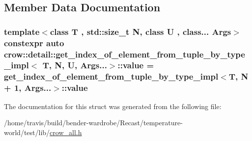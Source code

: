 \subsection{Member Data Documentation}
\hypertarget{structcrow_1_1detail_1_1get__index__of__element__from__tuple__by__type__impl_3_01_t_00_01_n_00_01_u_00_01_args_8_8_8_4_a5caffa263c0c6d186e32e158c3dc8aee}{
\subsubsection[{value}]{\setlength{\rightskip}{0pt plus 5cm}template$<$class T , std\-::size\-\_\-t N, class U , class... Args$>$ constexpr auto {\bf crow\-::detail\-::get\-\_\-index\-\_\-of\-\_\-element\-\_\-from\-\_\-tuple\-\_\-by\-\_\-type\-\_\-impl}$<$ T, N, U, Args...$>$\-::value = {\bf get\-\_\-index\-\_\-of\-\_\-element\-\_\-from\-\_\-tuple\-\_\-by\-\_\-type\-\_\-impl}$<$T, N + 1, Args...$>$\-::value\hspace{0.3cm}{\ttfamily [static]}}}\label{structcrow_1_1detail_1_1get__index__of__element__from__tuple__by__type__impl_3_01_t_00_01_n_00_01_u_00_01_args_8_8_8_4_a5caffa263c0c6d186e32e158c3dc8aee}


The documentation for this struct was generated from the following file\-:\begin{DoxyCompactItemize}
\item 
/home/travis/build/bender-\/wardrobe/\-Recast/temperature-\/world/test/lib/\hyperlink{crow__all_8h}{crow\-\_\-all.\-h}\end{DoxyCompactItemize}
